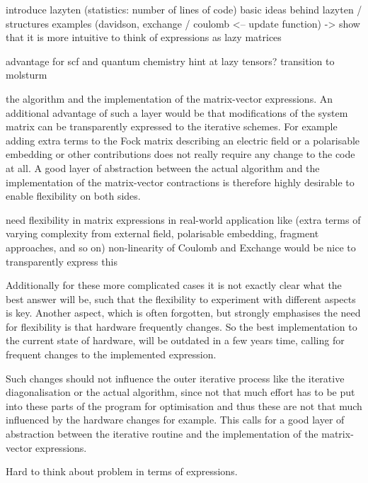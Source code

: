 introduce lazyten (statistics: number of lines of code)
basic ideas behind lazyten / structures
examples (davidson, exchange / coulomb <-- update function)
-> show that it is more intuitive to think of \contraction expressions as lazy matrices

advantage for scf and quantum chemistry
hint at lazy tensors?
transition to molsturm



the \SCF algorithm
and the implementation of the matrix-vector \contraction expressions.
An additional advantage of such a layer would be that
modifications of the system matrix can be transparently expressed
to the iterative schemes.
For example adding extra terms to the Fock matrix
describing an electric field or a polarisable embedding
or other contributions does not really require
any change to the \SCF code at all.
A good layer of abstraction between the actual \SCF algorithm
and the implementation of the matrix-vector contractions
is therefore highly desirable to enable flexibility on both sides.

need flexibility in matrix expressions in real-world application
like \SCF (extra terms of varying complexity from external field,
polarisable embedding, fragment approaches, and so on)
non-linearity of Coulomb and Exchange
would be nice to transparently express this


Additionally for these more complicated cases
it is not exactly clear what the best answer will be,
such that the flexibility to experiment with different aspects is key.
Another aspect, which is often forgotten,
but strongly emphasises the need for flexibility
is that hardware frequently changes.
So the best implementation to the current state of hardware,
will be outdated in a few years time,
calling for frequent changes to the implemented \contraction expression.

Such changes should not influence the outer iterative process
like the iterative diagonalisation or the actual \SCF algorithm,
since not that much effort has to be put into these parts
of the program for optimisation
and thus these are not that much influenced by the hardware changes for example.
This calls for a good layer of abstraction between the
iterative routine and the implementation of the matrix-vector \contraction expressions.

Hard to think about problem in terms of expressions.


